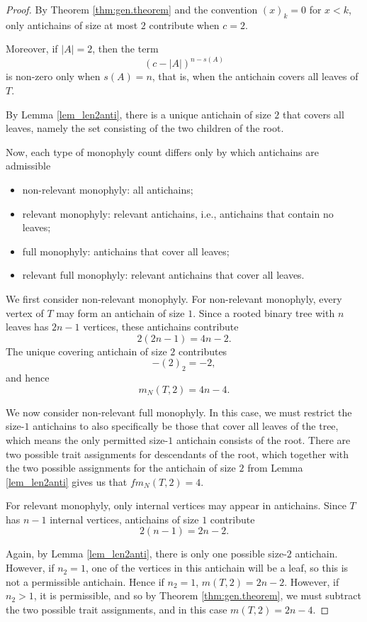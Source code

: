 \documentclass{amsart}
\theoremstyle{definition}
\begin{document}
\begin{proof}
By Theorem \ref{thm:gen.theorem} and the convention $(x)_k=0$ for $x<k$,
only antichains of size at most $2$ contribute when $c=2$.

Moreover, if $|A|=2$, then the term
\[
(c-|A|)^{n-s(A)}
\]
is non-zero only when $s(A)=n$, that is, when the antichain covers all leaves of $T$.

By Lemma \ref{lem_len2anti}, there is a unique antichain of size $2$ that covers all leaves, namely the set consisting of the two children of the root.

Now, each type of monophyly count differs only by which antichains are admissible

\begin{itemize}
\item non-relevant monophyly: all antichains;
\item relevant monophyly: relevant antichains, i.e., antichains that contain no leaves;
\item full monophyly: antichains that cover all leaves;
\item relevant full monophyly: relevant antichains that cover all leaves.
\end{itemize}

We first consider non-relevant monophyly. For non-relevant monophyly, every vertex of $T$ may form an antichain of size $1$. Since a rooted binary tree with $n$ leaves has $2n-1$ vertices, these antichains contribute
\[
2(2n-1)=4n-2.
\]
The unique covering antichain of size $2$ contributes
\[
-(2)_2= -2,
\]
and hence
\[
m_N(T,2)=4n-4.\]

We now consider non-relevant full monophyly. In this case, we must restrict the size-$1$ antichains to also specifically be those that cover all leaves of the tree, which means the only permitted size-$1$ antichain consists of the root. There are two possible trait assignments for descendants of the root, which together with the two possible assignments for the antichain of size $2$ from Lemma \ref{lem_len2anti} gives us that $fm_N(T,2)=4$.

For relevant monophyly, only internal vertices may appear in antichains. Since $T$ has $n-1$ internal vertices, antichains of size $1$ contribute
\[
2(n-1)=2n-2.
\] 

Again, by Lemma \ref{lem_len2anti}, there is only one possible size-$2$ antichain. However, if $n_2=1$, one of the vertices in this antichain will be a leaf, so this is not a permissible antichain. Hence if $n_2=1$, $m(T,2)=2n-2$. However, if $n_2>1$, it is permissible, and so by Theorem \ref{thm:gen.theorem}, we must subtract the two possible trait assignments, and in this case $m(T,2)=2n-4$.


\end{proof}
\end{document}
